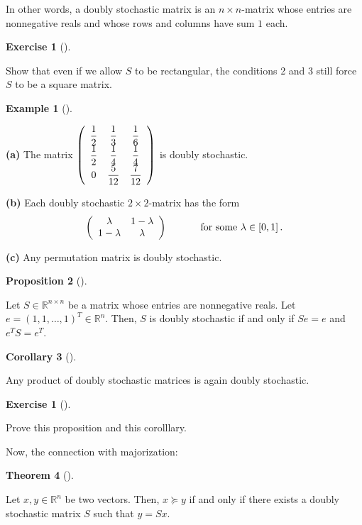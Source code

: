 \documentclass[numbers=enddot,12pt,final,onecolumn,notitlepage]{scrartcl}%
\newcounter{exer}
\numberwithin{exer}{subsection}
\theoremstyle{definition}
\newtheorem{theo}{Theorem}[subsection]
\newenvironment{theorem}[1][]
{\begin{theo}[#1]\begin{leftbar}}
{\end{leftbar}\end{theo}}
\newtheorem{prop}[theo]{Proposition}
\newenvironment{proposition}[1][]
{\begin{prop}[#1]\begin{leftbar}}
{\end{leftbar}\end{prop}}
\newtheorem{coro}[theo]{Corollary}
\newenvironment{corollary}[1][]
{\begin{coro}[#1]\begin{leftbar}}
{\end{leftbar}\end{coro}}
\newtheorem{exam}[theo]{Example}
\newenvironment{example}[1][]
{\begin{exam}[#1]\begin{leftbar}}
{\end{leftbar}\end{exam}}
\newtheorem{exmp}[exer]{Exercise}
\newenvironment{exercise}[1][]
{\begin{exmp}[#1]\begin{leftbar}}
{\end{leftbar}\end{exmp}}
\begin{document}
In other words, a doubly stochastic matrix is an $n\times n$-matrix whose
entries are nonnegative reals and whose rows and columns have sum $1$ each.

\begin{exercise}
Show that even if we allow $S$ to be rectangular, the conditions 2 and 3 still
force $S$ to be a square matrix.
\end{exercise}

\begin{example}
\textbf{(a)} The matrix $\left(
\begin{array}
[c]{ccc}%
\dfrac{1}{2} & \dfrac{1}{3} & \dfrac{1}{6}\\
\dfrac{1}{2} & \dfrac{1}{4} & \dfrac{1}{4}\\
0 & \dfrac{5}{12} & \dfrac{7}{12}%
\end{array}
\right)  $ is doubly stochastic. \medskip

\textbf{(b)} Each doubly stochastic $2\times2$-matrix has the form%
\[
\left(
\begin{array}
[c]{cc}%
\lambda & 1-\lambda\\
1-\lambda & \lambda
\end{array}
\right)  \ \ \ \ \ \ \ \ \ \ \text{for some }\lambda\in\left[  0,1\right]  .
\]


\textbf{(c)} Any permutation matrix is doubly stochastic.
\end{example}

\begin{proposition}
Let $S\in\mathbb{R}^{n\times n}$ be a matrix whose entries are nonnegative
reals. Let $e=\left(  1,1,\ldots,1\right)  ^{T}\in\mathbb{R}^{n}$. Then, $S$
is doubly stochastic if and only if $Se=e$ and $e^{T}S=e^{T}$.
\end{proposition}

\begin{corollary}
Any product of doubly stochastic matrices is again doubly stochastic.
\end{corollary}

\begin{exercise}
Prove this proposition and this corolllary.
\end{exercise}

Now, the connection with majorization:

\begin{theorem}
Let $x,y\in\mathbb{R}^{n}$ be two vectors. Then, $x\succcurlyeq y$ if and only
if there exists a doubly stochastic matrix $S$ such that $y=Sx$.
\end{theorem}
\end{document}
